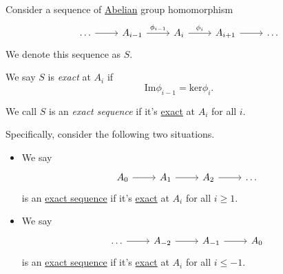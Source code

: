 Consider a sequence of \hyperref[def:Abelian-group]{Abelian} group homomorphism
\[
	\begin{tikzcd}
		\ldots & {A_{i-1}} & {A_i} & {A_{i+1}} & \ldots
		\arrow[from=1-1, to=1-2]
		\arrow["{\phi_{i-1}}", from=1-2, to=1-3]
		\arrow["{\phi_i}", from=1-3, to=1-4]
		\arrow[from=1-4, to=1-5]
	\end{tikzcd}
\]
We denote this sequence as \(S\).

\begin{definition}[Exact]\label{def:apx:aexact}
	We say \(S\) is \emph{exact} at \(A_{i} \) if
	\[
		\mathrm{Im} \phi _{i-1} = \mathrm{ker}\phi _{i} .
	\]
\end{definition}

\begin{definition}\label{def:exact-sequence}
	We call \(S\) is an \emph{exact sequence} if it's \hyperref[def:apx:exact]{exact} at \(A_{i} \) for all \(i\).
\end{definition}

\begin{remark}
	Specifically, consider the following two situations.
	\begin{itemize}
		\item We say
		      \[\begin{tikzcd}
				      {A_0} & {A_{1}} & {A_2} & \ldots
				      \arrow[from=1-1, to=1-2]
				      \arrow[from=1-2, to=1-3]
				      \arrow[from=1-3, to=1-4]
			      \end{tikzcd}\]
		      is an \hyperref[def:exact-sequence]{exact sequence} if it's \hyperref[def:apx:exact]{exact} at \(A_{i} \) for all \(i\geq 1\).
		\item We say
		      \[\begin{tikzcd}
				      \ldots & {A_{-2}} & {A_{-1}} & {A_0}
				      \arrow[from=1-3, to=1-4]
				      \arrow[from=1-1, to=1-2]
				      \arrow[from=1-2, to=1-3]
			      \end{tikzcd}\]
		      is an \hyperref[def:exact-sequence]{exact sequence} if it's \hyperref[def:apx:exact]{exact} at \(A_{i} \) for all \(i\leq -1\).
	\end{itemize}
\end{remark}